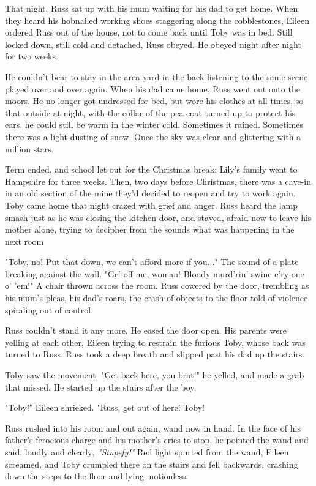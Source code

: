 \documentclass[a4paper,11pt]{article}
\begin{document}
That night, Russ sat up with his mum waiting for his dad to get home. When they heard his hobnailed working shoes staggering along the cobblestones, Eileen ordered Russ out of the house, not to come back until Toby was in bed. Still locked down, still cold and detached, Russ obeyed. He obeyed night after night for two weeks.

He couldn't bear to stay in the area yard in the back listening to the same scene played over and over again. When his dad came home, Russ went out onto the moors. He no longer got undressed for bed, but wore his clothes at all times, so that outside at night, with the collar of the pea coat turned up to protect his ears, he could still be warm in the winter cold. Sometimes it rained. Sometimes there was a light dusting of snow. Once the sky was clear and glittering with a million stars.

Term ended, and school let out for the Christmas break; Lily's family went to Hampshire for three weeks. Then, two days before Christmas, there was a cave-in in an old section of the mine they'd decided to reopen and try to work again. Toby came home that night crazed with grief and anger. Russ heard the lamp smash just as he was closing the kitchen door, and stayed, afraid now to leave his mother alone, trying to decipher from the sounds what was happening in the next room

"Toby, no! Put that down, we can't afford more if you..." The sound of a plate breaking against the wall. "Ge' off me, woman! Bloody murd'rin' swine e'ry one o' 'em!" A chair thrown across the room. Russ cowered by the door, trembling as his mum's pleas, his dad's roars, the crash of objects to the floor told of violence spiraling out of control.

Russ couldn't stand it any more. He eased the door open. His parents were yelling at each other, Eileen trying to restrain the furious Toby, whose back was turned to Russ. Russ took a deep breath and slipped past his dad up the stairs.

Toby saw the movement. "Get back here, you brat!" he yelled, and made a grab that missed. He started up the stairs after the boy.

"Toby!" Eileen shrieked. "Russ, get out of here! Toby!

Russ rushed into his room and out again, wand now in hand. In the face of his father's ferocious charge and his mother's cries to stop, he pointed the wand and said, loudly and clearly\emph{, "Stupefy!"} Red light spurted from the wand, Eileen screamed, and Toby crumpled there on the stairs and fell backwards, crashing down the steps to the floor and lying motionless.
\end{document}
